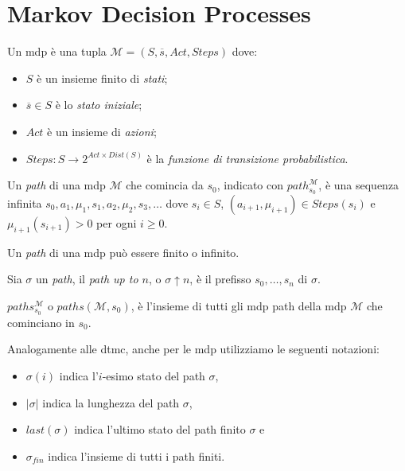 \section{Markov Decision Processes}

\begin{mtdef}
	Un \ac{mdp} è una tupla $\mathcal{M} = (S, \overline{s}, Act, Steps)$ dove:
	\begin{itemize}
		\item $S$ è un insieme finito di \emph{stati};
		\item $\overline{s} \in S$ è lo \emph{stato iniziale};
		\item $Act$ è un insieme di \emph{azioni};
		\item $Steps: S \rightarrow 2^{Act \times Dist(S)}$ è la \emph{funzione di transizione probabilistica}.
	\end{itemize}
\end{mtdef}

\begin{mtdef}
	Un \emph{path} di una \ac{mdp} $\mathcal{M}$ che comincia da $s_0$, indicato con $path_{s_0}^{\mathcal{M}}$, è una sequenza infinita $s_0, a_1, \mu_1, s_1, a_2, \mu_2, s_3, \dots$ dove $s_i \in S$, $(a_{i+1},\mu_{i+1})\in Steps(s_i)$ e $\mu_{i+1}(s_{i+1}) > 0$ per ogni $i\geq 0$.
\end{mtdef}

\begin{mtobs}
	Un \emph{path} di una \ac{mdp} può essere finito o infinito.
\end{mtobs}

\begin{mtdef}
	Sia $\sigma$ un \emph{path}, il \emph{path up to $n$}, o $\sigma \uparrow n$, è il prefisso $s_0, \dots, s_n$ di $\sigma$.
\end{mtdef}

\begin{mtdef}
	$paths_{s_0}^{\mathcal{M}}$ o $paths(\mathcal{M}, s_0)$, è l'insieme di tutti gli \ac{mdp} path della \ac{mdp} $\mathcal{M}$ che cominciano in $s_0$.
\end{mtdef}

Analogamente alle \ac{dtmc}, anche per le \ac{mdp} utilizziamo le seguenti notazioni:
\begin{itemize}
	\item $\sigma(i)$ indica l'$i$-esimo stato del path $\sigma$,
	\item $|\sigma|$ indica la lunghezza del path $\sigma$,
	\item $last(\sigma)$ indica l'ultimo stato del path finito $\sigma$ e
	\item $\sigma_{fin}$ indica l'insieme di tutti i path finiti.
\end{itemize}

